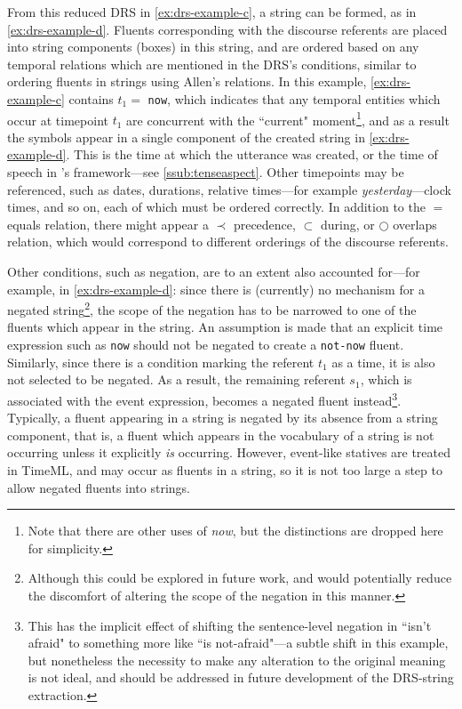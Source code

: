 \documentclass[a4paper,12pt,leqno]{article}
\begin{document}
From this reduced DRS in \cref{ex:drs-example-c}, a string can be formed, as in \cref{ex:drs-example-d}. Fluents corresponding with the discourse referents are placed into string components (boxes) in this string, and are ordered based on any temporal relations which are mentioned in the DRS's conditions, similar to ordering fluents in strings using Allen's relations. In this example, \cref{ex:drs-example-c} contains $t_1 =$ \texttt{now}, which indicates that any temporal entities which occur at timepoint $t_1$ are concurrent with the ``current" moment\footnote{Note that there are other uses of \textit{now}, but the distinctions are dropped here for simplicity.}, and as a result the symbols appear in a single component of the created string in \cref{ex:drs-example-d}. This is the time at which the utterance was created, or the time of speech in \citet{reichenbach1947elements}'s framework---see \cref{ssub:tenseaspect}. Other timepoints may be referenced, such as dates, durations, relative times---for example \textit{yesterday}---clock times, and so on, each of which must be ordered correctly. In addition to the $=$ equals relation, there might appear a $\prec$ precedence, $\subset$ during, or $\bigcirc$ overlaps relation, which would correspond to different orderings of the discourse referents.

Other conditions, such as negation, are to an extent also accounted for---for example, in \cref{ex:drs-example-d}: since there is (currently) no mechanism for a negated string\footnote{Although this could be explored in future work, and would potentially reduce the discomfort of altering the scope of the negation in this manner.}, the scope of the negation has to be narrowed to one of the fluents which appear in the string. %
An assumption is made that an explicit time expression such as \texttt{now} should not be negated to create a \texttt{not-now} fluent. Similarly, since there is a condition marking the referent $t_1$ as a time, it is also not selected to be negated. As a result, the remaining referent $s_1$, which is associated with the event expression, becomes a negated fluent instead\footnote{This has the implicit effect of shifting the sentence-level negation in ``isn't afraid" to something more like ``is not-afraid"---a subtle shift in this example, but nonetheless the necessity to make any alteration to the original meaning is not ideal, and should be addressed in future development of the DRS-string extraction.}. Typically, a fluent appearing in a string is negated by its absence from a string component, that is, a fluent which appears in the vocabulary of a string is not occurring unless it explicitly \textit{is} occurring. However, event-like statives are treated in TimeML, and may occur as fluents in a string, so it is not too large a step to allow negated fluents into strings.
\end{document}
